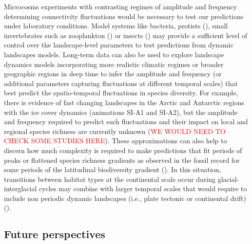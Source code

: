 \documentclass[12pt]{article}
\newcommand{\carlos}[1]{\textcolor{Red}{#1}}
\begin{document}
Microcosms experiments with contrasting regimes of amplitude and frequency determining connectivity fluctuations would be necessary to test our predictions under laboratory conditions. Model systems like bacteria, protists (\cite{Carrara2012dendritic}), small invertebrates such as zooplankton (\cite{Steiner2011seasonal_experiments}) or insects (\cite{GovindanSwihart2012}) may provide a sufficient level of control over the landscape-level parameters to test predictions from dynamic landscapes models. Long-term data can also be used to explore landscape dynamics models incorporating more realistic climatic regimes or broader geographic regions in deep time to infer the amplitude and frequency (or additional parameters capturing fluctuations at different temporal scales) that best predict the spatio-temporal fluctuations in species diversity. For example, there is evidence of fast changing landscapes in the Arctic and Antarctic regions with the ice cover dynamics (animations SI-A1 and SI-A2), but the amplitude and frequency required to predict such fluctuations and their impact on local and regional species richness are currently unknown (\carlos{WE WOULD NEED TO CHECK SOME STUDIES HERE}). These approximations can also help to discern how much complexity is required to make predictions that fit periods of peaks or flattened species richness gradients as observed in the fossil record for some periods of the latitudinal biodiversity gradient (\cite{mannionetal2014}). In this situation, transitions between habitat types at the continental scale occur during glacial-interglacial cycles may combine with larger temporal scales that would require to include non periodic dynamic landscapes (i.e., plate tectonic or continental drift) (\cite{WerneckEtAl2011}).

 
\subsection*{Future perspectives}
\end{document}
